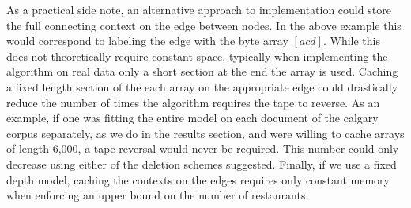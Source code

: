 \documentclass{article}
\begin{document}
As a practical side note, an alternative approach to implementation could store the full connecting context on the edge between nodes.  In the above example this would correspond to labeling the edge with the byte array $[acd]$.  While this does not theoretically require constant space, typically when implementing the algorithm on real data only a short section at the end the array is used.  Caching a fixed length section of the each array on the appropriate edge could drastically reduce the number of times the algorithm requires the tape to reverse.  As an example, if one was fitting the entire model on each document of the calgary corpus separately, as we do in the results section, and were willing to cache arrays of length 6,000, a tape reversal would never be required.  This number could only decrease using either of the deletion schemes suggested.  Finally, if we use a fixed depth model, caching the contexts on the edges requires only constant memory when enforcing an upper bound on the number of restaurants.



\end{document}
